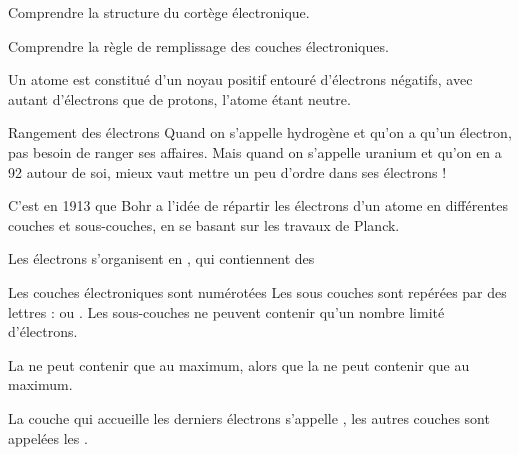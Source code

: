 \teteSndAtom

\vspace*{-36pt}

\begin{objectifs}
  \item Comprendre la structure du cortège électronique.
  \item Comprendre la règle de remplissage des couches électroniques.
\end{objectifs}

\begin{contexte}
  Un atome est constitué d'un noyau positif entouré d'électrons négatifs, avec autant d'électrons que de protons, l'atome étant neutre.
  
\end{contexte}


\begin{doc}{Rangement des électrons}
  Quand on s'appelle hydrogène et qu'on a qu'un électron, pas besoin de ranger ses affaires.
  Mais quand on s'appelle uranium et qu'on en a 92 autour de soi, mieux vaut mettre un peu d'ordre dans ses électrons !
  
  \begin{figure}
    \centering
    \vspace*{-24pt}
    
  \end{figure}
  
  C'est en 1913 que Bohr a l'idée de répartir les électrons d'un atome en différentes couches et sous-couches, en se basant sur les travaux de Planck.

  Les électrons s'organisent en , qui contiennent des 
  
  Les couches électroniques sont numérotées 
  Les sous couches sont repérées par des lettres :  ou .
  Les sous-couches ne peuvent contenir qu'un nombre limité d'électrons.

  \begin{importants}  
    La  ne peut contenir que  au maximum,
    alors que la  ne peut contenir que  au maximum.
  \end{importants}
  
  La couche qui accueille les derniers électrons s'appelle , les autres couches sont appelées les .
\end{doc}

